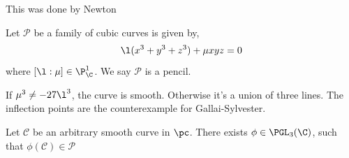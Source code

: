 \documentclass{article}
\begin{document}
This was done by Newton


\begin{ndefi}
  Let $\mathcal{P}$ be a family of cubic curves is given by,
  \begin{equation}
    \l (x^3 + y^3 + z^3) + \mu xyz = 0
  \end{equation}
  where $[\l : \mu] \in \P_\C^1$. We say $\mathcal{P}$ is a pencil.
\end{ndefi}
If $\mu^3 \ne -27\l ^3$, the curve is smooth. Otherwise it's a union of three lines. The inflection points are the counterexample for Gallai-Sylvester.

\begin{nthm}
  Let $\mathcal{C}$ be an arbitrary smooth curve in $\pc$. There exists $\phi \in \PGL_3(\C)$, such that $\phi(\mathcal{C}) \in \mathcal{P}$
\end{nthm}
\end{document}
